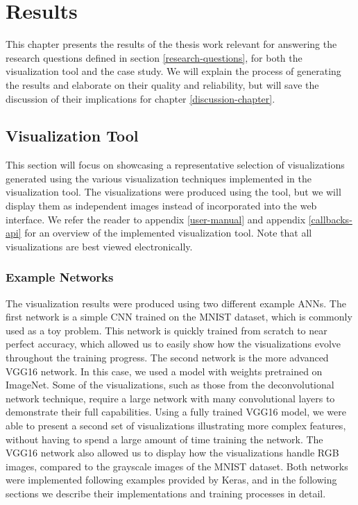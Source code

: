 
\chapter{Results} \label{results-chapter}

This chapter presents the results of the thesis work relevant for answering the research questions defined in section \ref{research-questions}, for both the visualization tool and the case study. We will explain the process of generating the results and elaborate on their quality and reliability, but will save the discussion of their implications for chapter \ref{discussion-chapter}.

\section{Visualization Tool} \label{results-chapter-vis}

This section will focus on showcasing a representative selection of visualizations generated using the various visualization techniques implemented in the visualization tool. The visualizations were produced using the tool, but we will display them as independent images instead of incorporated into the web interface. We refer the reader to appendix \ref{user-manual} and appendix \ref{callbacks-api} for an overview of the implemented visualization tool. Note that all visualizations are best viewed electronically.


\subsection{Example Networks} \label{example-networks}

The visualization results were produced using two different example ANNs. The first network is a simple CNN trained on the MNIST dataset, which is commonly used as a toy problem. This network is quickly trained from scratch to near perfect accuracy, which allowed us to easily show how the visualizations evolve throughout the training progress. The second network is the more advanced VGG16 network. In this case, we used a model with weights pretrained on ImageNet. Some of the visualizations, such as those from the deconvolutional network technique, require a large network with many convolutional layers to demonstrate their full capabilities. Using a fully trained VGG16 model, we were able to present a second set of visualizations illustrating more complex features, without having to spend a large amount of time training the network. The VGG16 network also allowed us to display how the visualizations handle RGB images, compared to the grayscale images of the MNIST dataset. Both networks were implemented following examples provided by Keras, and in the following sections we describe their implementations and training processes in detail.\\

